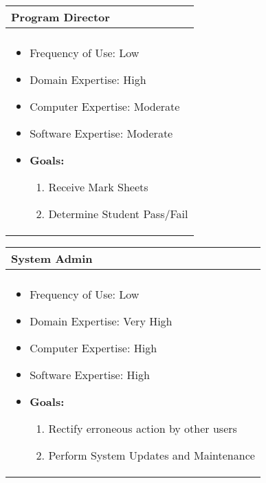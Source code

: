 \documentclass[11pt]{article}
\begin{document}
\begin{center}
\begin{tabular}{ | m{12cm} | } 
 \hline
 \textbf{Program Director}   \\ 
  \hline
  \\[5pt]
\begin{itemize}
\item{Frequency of Use: Low}
\item{Domain Expertise: High}
\item{Computer Expertise: Moderate}
\item{Software Expertise: Moderate}
\item{\textbf{Goals:}}
\begin{enumerate}
\item{Receive Mark Sheets}
\item{Determine Student Pass/Fail}
\end{enumerate}
\end{itemize} \\
 \hline
\end{tabular}
\end{center}

\begin{center}
\begin{tabular}{ | m{12cm} | } 
 \hline
 \textbf{System Admin}   \\ 
  \hline
  \\[5pt]
\begin{itemize}
\item{Frequency of Use: Low}
\item{Domain Expertise: Very High}
\item{Computer Expertise: High}
\item{Software Expertise: High}
\item{\textbf{Goals:}}
\begin{enumerate}
\item{Rectify erroneous action by other users}
\item{Perform System Updates and Maintenance}
\end{enumerate}
\end{itemize} \\
 \hline
\end{tabular}
\end{center}
\end{document}
